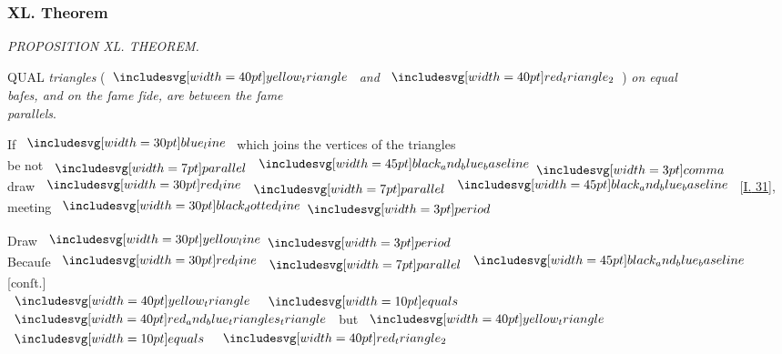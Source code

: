 \documentclass[12pt,preview]{standalone}
\begin{document}
\subsubsection{XL. Theorem}

\begin{minipage}[t]{0.64\textwidth}
    \vspace{0pt}

    \begin{center}
        \textit{PROPOSITION XL. THEOREM.}\label{book1pr40} \\
    \end{center}

    \hfill

    \begin{center}
        \raggedright \lettrine[lines=4, loversize=1, nindent=0pt]{}{}QUAL \textit{triangles} (\hspace{-2ex}$\img[0][0][40]{yellow_triangle}$ \textit{and} $\img[0][0][40]{red_triangle_2}$\hspace{-2ex}) \textit{on equal\\ baſes, and on the ſame ſide, are between the ſame\\ parallels}.
    \end{center}

    \hfill

    \hfill

    \begin{center}
        If $\blueline$ which joins the vertices of the triangles\\
        be not $\bparallel \bimg{black_and_blue_baseline} \bcomma$\\
        draw $\redline \bparallel \bimg{black_and_blue_baseline}$ [\hyperref[book1pr31]{\textsc{I.} 31}],\\
        meeting $\dottedblackline \bperiod$
    \end{center}

    \hfill

    \begin{center}
        Draw $\yellowline \bperiod$\\
        Becauſe $\redline \bparallel \bimg{black_and_blue_baseline}$ [conſt.]\\
        $\img[0][0][40]{yellow_triangle}$\hspace{-1ex} $\bequals$ \hspace{-1ex}$\img[0][0][40]{red_and_blue_triangles_triangle}$\hspace{-2ex} but \hspace{-2ex}$\img[0][0][40]{yellow_triangle}$\hspace{-1ex} $\bequals$ \hspace{-1ex}$\img[0][0][40]{red_triangle_2}$\\
    \end{center}


\end{minipage}
\end{document}
